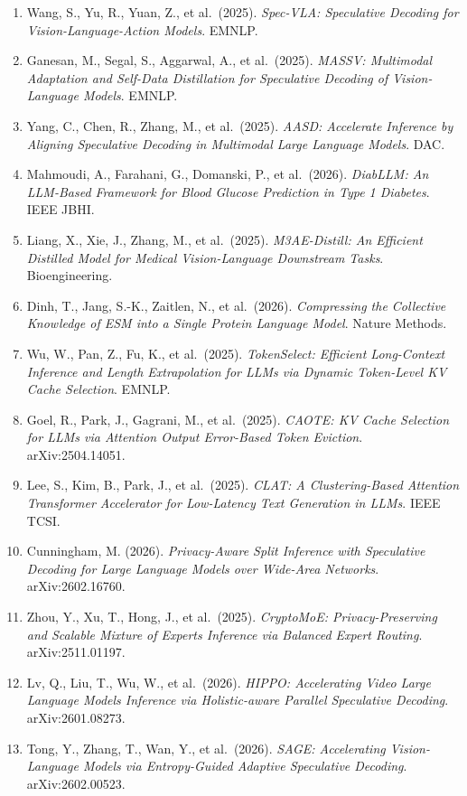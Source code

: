 \begin{enumerate}
\item
  Wang, S., Yu, R., Yuan, Z., et al.~(2025). \emph{Spec-VLA: Speculative Decoding for Vision-Language-Action Models}. EMNLP.
\item
  Ganesan, M., Segal, S., Aggarwal, A., et al.~(2025). \emph{MASSV: Multimodal Adaptation and Self-Data Distillation for Speculative Decoding of Vision-Language Models}. EMNLP.
\item
  Yang, C., Chen, R., Zhang, M., et al.~(2025). \emph{AASD: Accelerate Inference by Aligning Speculative Decoding in Multimodal Large Language Models}. DAC.
\item
  Mahmoudi, A., Farahani, G., Domanski, P., et al.~(2026). \emph{DiabLLM: An LLM-Based Framework for Blood Glucose Prediction in Type 1 Diabetes}. IEEE JBHI.
\item
  Liang, X., Xie, J., Zhang, M., et al.~(2025). \emph{M3AE-Distill: An Efficient Distilled Model for Medical Vision-Language Downstream Tasks}. Bioengineering.
\item
  Dinh, T., Jang, S.-K., Zaitlen, N., et al.~(2026). \emph{Compressing the Collective Knowledge of ESM into a Single Protein Language Model}. Nature Methods.
\item
  Wu, W., Pan, Z., Fu, K., et al.~(2025). \emph{TokenSelect: Efficient Long-Context Inference and Length Extrapolation for LLMs via Dynamic Token-Level KV Cache Selection}. EMNLP.
\item
  Goel, R., Park, J., Gagrani, M., et al.~(2025). \emph{CAOTE: KV Cache Selection for LLMs via Attention Output Error-Based Token Eviction}. arXiv:2504.14051.
\item
  Lee, S., Kim, B., Park, J., et al.~(2025). \emph{CLAT: A Clustering-Based Attention Transformer Accelerator for Low-Latency Text Generation in LLMs}. IEEE TCSI.
\item
  Cunningham, M. (2026). \emph{Privacy-Aware Split Inference with Speculative Decoding for Large Language Models over Wide-Area Networks}. arXiv:2602.16760.
\item
  Zhou, Y., Xu, T., Hong, J., et al.~(2025). \emph{CryptoMoE: Privacy-Preserving and Scalable Mixture of Experts Inference via Balanced Expert Routing}. arXiv:2511.01197.
\item
  Lv, Q., Liu, T., Wu, W., et al.~(2026). \emph{HIPPO: Accelerating Video Large Language Models Inference via Holistic-aware Parallel Speculative Decoding}. arXiv:2601.08273.
\item
  Tong, Y., Zhang, T., Wan, Y., et al.~(2026). \emph{SAGE: Accelerating Vision-Language Models via Entropy-Guided Adaptive Speculative Decoding}. arXiv:2602.00523.

\end{enumerate}
